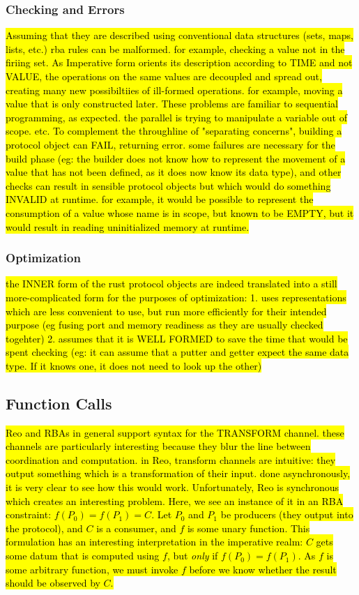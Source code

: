 \subsubsection{Checking and Errors}
\hl{Assuming that they are described using conventional data structures (sets, maps, lists, etc.) rba rules can be malformed. for example, checking a value not in the firiing set. As  Imperative form orients its description according to TIME and not VALUE, the operations on the same values are decoupled and spread out, creating many new possibiltiies of ill-formed operations. for example, moving a value that is only constructed later. These problems are familiar to sequential programming, as expected. the parallel is trying to manipulate a variable out of scope. etc.
To complement the throughline of "separating concerns", building a protocol object can FAIL, returning error. some failures are necessary for the build phase (eg: the builder does not know how to represent the movement of a value that has not been defined, as it does now know its data type), and other checks can result in sensible protocol objects but which would do something INVALID at runtime. for example, it would be possible to represent the consumption of a value whose name is in scope, but known to be EMPTY, but it would result in reading uninitialized memory at runtime.
}



\subsubsection{Optimization}
\hl{the INNER form of the rust protocol objects are indeed translated into a still more-complicated form for the purposes of optimization:
1. uses representations which are less convenient to use, but run more efficiently for their intended purpose (eg fusing port and memory readiness as they are usually checked togehter)
2. assumes that it is WELL FORMED to save the time that would be spent checking (eg: it can assume that a putter and getter expect the same data type. If it knows one, it does not need to look up the other)
}


\subsection{Function Calls}
\hl{Reo and RBAs in general support syntax for the TRANSFORM channel. these channels are particularly interesting because they blur the line between coordination and computation. in Reo, transform channels are intuitive: they output something which is a transformation of their input. done asynchronously, it is very clear to see how this would work. Unfortunately, Reo is synchronous which creates an interesting problem. Here, we see an instance of it in an RBA constraint: $f(P_0)=f(P_1)=C$. Let $P_0$ and $P_1$ be producers (they output into the protocol), and $C$ is a consumer, and $f$ is some unary function. This formulation has an interesting interpretation in the imperative realm: $C$ gets some datum that is computed using $f$, but \textit{only} if $f(P_0)=f(P_1)$. As $f$ is some arbitrary function, we must invoke $f$ before we know whether the result should be observed by $C$. }